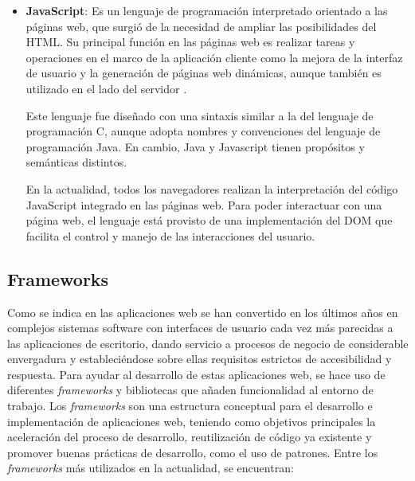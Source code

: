 \begin{itemize}
\item \textbf{JavaScript}: Es un lenguaje de programación interpretado orientado a las páginas web, que surgió de la necesidad de ampliar las posibilidades del HTML. Su principal función en las páginas web es realizar tareas y operaciones en el marco de la aplicación cliente como la mejora de la interfaz de usuario y la generación de páginas web dinámicas, aunque también es utilizado en el lado del servidor .

Este lenguaje fue diseñado con una sintaxis similar a la del lenguaje de programación C, aunque adopta nombres y convenciones del lenguaje de programación Java. En cambio, Java y Javascript tienen propósitos y semánticas distintos.

En la actualidad, todos los navegadores realizan la interpretación del código JavaScript integrado en las páginas web. Para poder interactuar con una página web, el lenguaje está provisto de una implementación del DOM que facilita el control y manejo de las interacciones del usuario.

\end{itemize}

\subsection{Frameworks}
\label{sec:frameworks}

Como se indica en \cite{garrido2004arquitectura} las aplicaciones web se han convertido en los últimos años en complejos sistemas software con interfaces de usuario cada vez más parecidas a las aplicaciones de escritorio, dando servicio a procesos de negocio de considerable envergadura y estableciéndose sobre ellas requisitos estrictos de accesibilidad y respuesta. Para ayudar al desarrollo de estas aplicaciones web, se hace uso de diferentes \emph{frameworks} y bibliotecas que añaden funcionalidad al entorno de trabajo. Los \emph{frameworks} son una estructura conceptual para el desarrollo e implementación de aplicaciones web, teniendo como objetivos principales la aceleración del proceso de desarrollo, reutilización de código ya existente y promover buenas prácticas de desarrollo, como el uso de patrones. Entre los \emph{frameworks} más utilizados en la actualidad, se encuentran:

